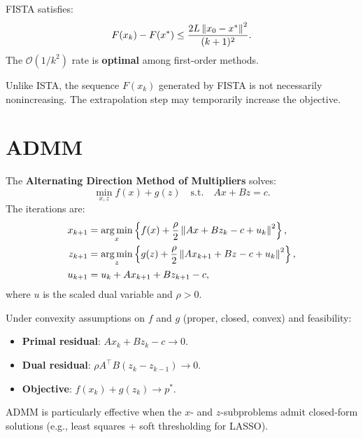 \begin{theorem}
FISTA satisfies:
\[
  F(x_k) - F(x^*) \leq \frac{2L \left\| x_0 - x^* \right\|^2}{(k+1)^2}.
\]
The $\mathcal{O}(1/k^2)$ rate is \textbf{optimal} among first-order methods.
\end{theorem}

\begin{warning}[title=\textbf{FISTA is not monotone}]
Unlike ISTA, the sequence $F(x_k)$ generated by FISTA is not necessarily
nonincreasing. The extrapolation step may temporarily increase the objective.
\end{warning}

\section{ADMM}

\begin{definition}[ADMM]
The \textbf{Alternating Direction Method of Multipliers} solves:
\[
  \min_{x, z} f(x) + g(z) \quad \text{s.t.} \quad Ax + Bz = c.
\]
The iterations are:
\begin{align*}
  x_{k+1} &= \operatorname*{arg\,min}_x \left\{ f(x) + \frac{\rho}{2}
    \left\| Ax + Bz_k - c + u_k \right\|^2 \right\}, \\
  z_{k+1} &= \operatorname*{arg\,min}_z \left\{ g(z) + \frac{\rho}{2}
    \left\| Ax_{k+1} + Bz - c + u_k \right\|^2 \right\}, \\
  u_{k+1} &= u_k + Ax_{k+1} + Bz_{k+1} - c,
\end{align*}
where $u$ is the scaled dual variable and $\rho > 0$.
\end{definition}

\begin{theorem}
Under convexity assumptions on $f$ and $g$ (proper, closed, convex) and
feasibility:
\begin{itemize}
  \item \textbf{Primal residual}: $Ax_k + Bz_k - c \to 0$.
  \item \textbf{Dual residual}: $\rho A^\top B(z_k - z_{k-1}) \to 0$.
  \item \textbf{Objective}: $f(x_k) + g(z_k) \to p^*$.
\end{itemize}
\end{theorem}

\begin{remark}
ADMM is particularly effective when the $x$- and $z$-subproblems admit
closed-form solutions (e.g., least squares + soft thresholding for LASSO).
\end{remark}

